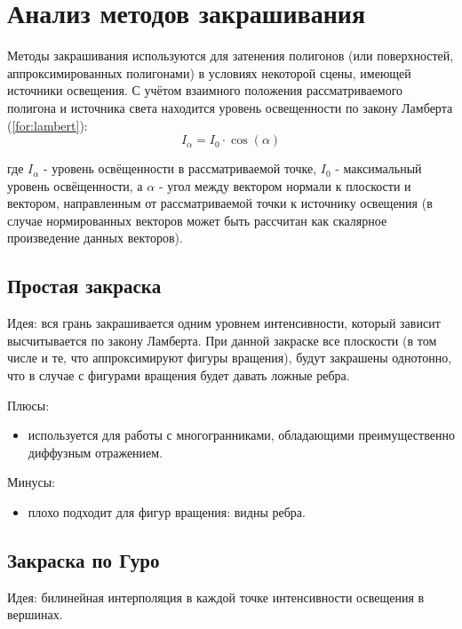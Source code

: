 \section{Анализ методов закрашивания}

Методы закрашивания используются для затенения полигонов (или поверхностей,
аппроксимированных полигонами) в условиях некоторой сцены, имеющей источники
освещения. С учётом взаимного положения рассматриваемого полигона и источника
света находится уровень освещенности по закону Ламберта (\ref{for:lambert}):
\begin{equation}
    \label{for:lambert}
    I_{\alpha} = I_0 \cdot \cos{(\alpha)}
\end{equation}

где $I_{\alpha}$ - уровень освёщенности в рассматриваемой точке, $I_0$ -
максимальный уровень освёщенности, а $\alpha$ - угол между вектором нормали к
плоскости и вектором, направленным от рассматриваемой точки к источнику
освещения (в случае нормированных векторов может быть рассчитан как скалярное
произведение данных векторов).

\subsection{Простая закраска}

Идея: вся грань закрашивается одним уровнем интенсивности, который зависит
высчитывается по закону Ламберта\cite{rogers}. При данной закраске все
плоскости (в том числе и те, что аппроксимируют фигуры вращения), будут
закрашены однотонно, что в случае с фигурами вращения будет давать ложные
ребра.

Плюсы:
\begin{itemize}
    \item используется для работы с многогранниками, обладающими преимущественно диффузным отражением.
\end{itemize}

Минусы:

\begin{itemize}
    \item плохо подходит для фигур вращения: видны ребра.
\end{itemize}

\subsection{Закраска по Гуро}
Идея: билинейная интерполяция в каждой точке интенсивности освещения в вершинах\cite{lmodels}.

